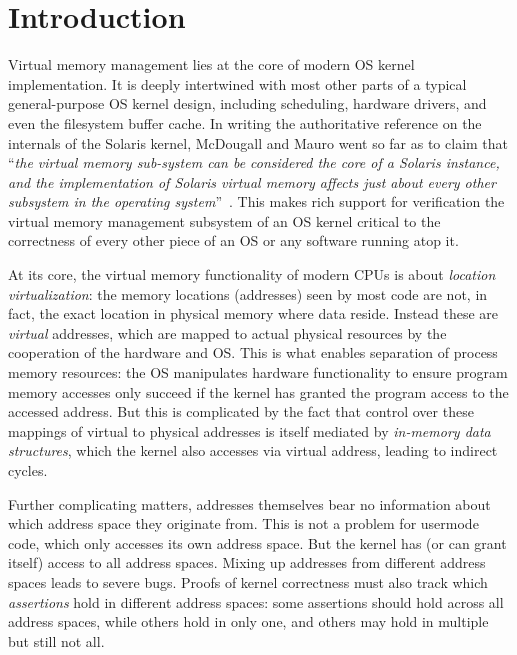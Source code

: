 \section{Introduction}
\label{sec:intro}
Virtual memory management lies at the core of modern OS kernel implementation. It is deeply intertwined with most other parts of a typical general-purpose OS kernel design, including scheduling, hardware drivers, and even the filesystem buffer cache. In writing the authoritative reference on the internals of the Solaris kernel, McDougall and Mauro went so far as to claim that ``\emph{the virtual memory sub-system can be considered the core of a Solaris instance, and the implementation of Solaris virtual memory affects just about every other subsystem in the operating system}''~\cite{mcdougall2006solaris}.
This makes rich support for verification the virtual memory management subsystem of an OS kernel critical to the correctness of every other piece of an OS or any software running atop it.

At its core, the virtual memory functionality of modern CPUs is about \emph{location virtualization}: the memory locations
(addresses) seen by most code are not, in fact, the exact location in physical memory where data reside. Instead these 
are \emph{virtual} addresses, which are mapped to actual physical resources by the cooperation of the hardware and OS. 
This is what enables separation of process memory resources:
the OS manipulates hardware functionality to ensure 
program memory accesses only succeed if the kernel has granted the program access to the accessed address.
But this is complicated by the fact that 
control over these mappings of virtual to physical addresses is itself mediated by \emph{in-memory data structures}, 
which the kernel also accesses via virtual address, leading to indirect cycles.

Further complicating matters, addresses themselves bear no information about which address space they originate 
from. 
This is not a problem for usermode code, which only accesses its own address space.
But the kernel has
(or can grant itself) access to all address spaces. Mixing up addresses from different address spaces leads to severe bugs.
Proofs of kernel correctness must also track which \emph{assertions} hold in different address spaces:
some assertions should hold across all address spaces, while others hold in only one, and others may hold in 
multiple but still not all.

